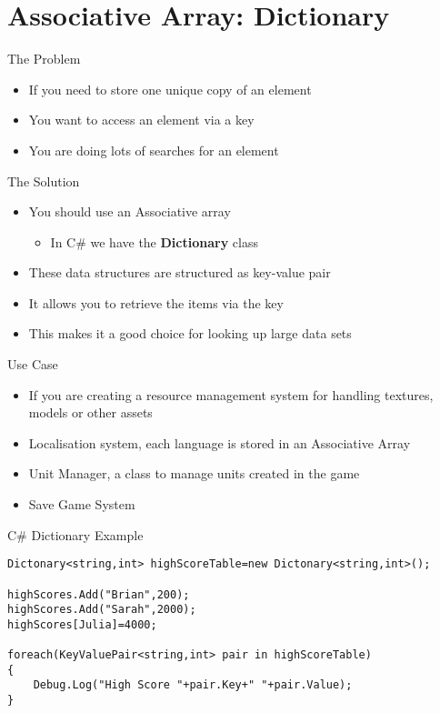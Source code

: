 \part{Associative Array: Dictionary}
\frame{\partpage}

\begin{frame}{The Problem}
	\begin{itemize}
		\pause \item If you need to store one unique copy of an element
		\pause \item You want to access an element via a key
		\pause \item You are doing lots of searches for an element
	\end{itemize}
\end{frame}

\begin{frame}{The Solution}
	\begin{itemize}
		\pause \item You should use an Associative array
		\begin{itemize}
			\pause \item In C\# we have the \textbf{Dictionary} class
		\end{itemize} 
		\pause \item These data structures are structured as key-value pair
		\pause \item It allows you to retrieve the items via the key
		\pause \item This makes it a good choice for looking up large data sets
	\end{itemize}
\end{frame}

\begin{frame}{Use Case}
	\begin{itemize}
		\pause \item If you are creating a resource management system for handling textures, models or other assets
		\pause \item Localisation system, each language is stored in an Associative Array
		\pause \item Unit Manager, a class to manage units created in the game
		\pause \item Save Game System
	\end{itemize}
\end{frame}

\begin{frame}[fragile]{C\# Dictionary
Example}
\begin{lstlisting}
Dictonary<string,int> highScoreTable=new Dictonary<string,int>();

highScores.Add("Brian",200);
highScores.Add("Sarah",2000);
highScores[Julia]=4000;

foreach(KeyValuePair<string,int> pair in highScoreTable)
{
	Debug.Log("High Score "+pair.Key+" "+pair.Value);
}
\end{lstlisting}
\end{frame}

